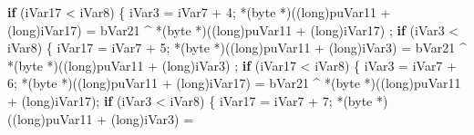 \documentclass[
]{article}
\newenvironment{Shaded}{}{}
\newcommand{\ControlFlowTok}[1]{\textcolor[rgb]{0.00,0.44,0.13}{\textbf{#1}}}
\newcommand{\DataTypeTok}[1]{\textcolor[rgb]{0.56,0.13,0.00}{#1}}
\newcommand{\DecValTok}[1]{\textcolor[rgb]{0.25,0.63,0.44}{#1}}
\newcommand{\NormalTok}[1]{#1}
\newcommand{\OperatorTok}[1]{\textcolor[rgb]{0.40,0.40,0.40}{#1}}
\begin{document}
\begin{Shaded}
\begin{Highlighting}[]
        \ControlFlowTok{if} \OperatorTok{(}\NormalTok{iVar17 }\OperatorTok{\textless{}}\NormalTok{ iVar8}\OperatorTok{)} \OperatorTok{\{}
\NormalTok{          iVar3 }\OperatorTok{=}\NormalTok{ iVar7 }\OperatorTok{+} \DecValTok{4}\OperatorTok{;}
          \OperatorTok{*(}\NormalTok{byte }\OperatorTok{*)((}\DataTypeTok{long}\OperatorTok{)}\NormalTok{puVar11 }\OperatorTok{+} \OperatorTok{(}\DataTypeTok{long}\OperatorTok{)}\NormalTok{iVar17}\OperatorTok{)} \OperatorTok{=}\NormalTok{ bVar21 }\OperatorTok{\^{}} \OperatorTok{*(}\NormalTok{byte }\OperatorTok{*)((}\DataTypeTok{long}\OperatorTok{)}\NormalTok{puVar11 }\OperatorTok{+} \OperatorTok{(}\DataTypeTok{long}\OperatorTok{)}\NormalTok{iVar17}\OperatorTok{)}
          \OperatorTok{;}
          \ControlFlowTok{if} \OperatorTok{(}\NormalTok{iVar3 }\OperatorTok{\textless{}}\NormalTok{ iVar8}\OperatorTok{)} \OperatorTok{\{}
\NormalTok{            iVar17 }\OperatorTok{=}\NormalTok{ iVar7 }\OperatorTok{+} \DecValTok{5}\OperatorTok{;}
            \OperatorTok{*(}\NormalTok{byte }\OperatorTok{*)((}\DataTypeTok{long}\OperatorTok{)}\NormalTok{puVar11 }\OperatorTok{+} \OperatorTok{(}\DataTypeTok{long}\OperatorTok{)}\NormalTok{iVar3}\OperatorTok{)} \OperatorTok{=}\NormalTok{ bVar21 }\OperatorTok{\^{}} \OperatorTok{*(}\NormalTok{byte }\OperatorTok{*)((}\DataTypeTok{long}\OperatorTok{)}\NormalTok{puVar11 }\OperatorTok{+} \OperatorTok{(}\DataTypeTok{long}\OperatorTok{)}\NormalTok{iVar3}\OperatorTok{)}
            \OperatorTok{;}
            \ControlFlowTok{if} \OperatorTok{(}\NormalTok{iVar17 }\OperatorTok{\textless{}}\NormalTok{ iVar8}\OperatorTok{)} \OperatorTok{\{}
\NormalTok{              iVar3 }\OperatorTok{=}\NormalTok{ iVar7 }\OperatorTok{+} \DecValTok{6}\OperatorTok{;}
              \OperatorTok{*(}\NormalTok{byte }\OperatorTok{*)((}\DataTypeTok{long}\OperatorTok{)}\NormalTok{puVar11 }\OperatorTok{+} \OperatorTok{(}\DataTypeTok{long}\OperatorTok{)}\NormalTok{iVar17}\OperatorTok{)} \OperatorTok{=}
\NormalTok{                   bVar21 }\OperatorTok{\^{}} \OperatorTok{*(}\NormalTok{byte }\OperatorTok{*)((}\DataTypeTok{long}\OperatorTok{)}\NormalTok{puVar11 }\OperatorTok{+} \OperatorTok{(}\DataTypeTok{long}\OperatorTok{)}\NormalTok{iVar17}\OperatorTok{);}
              \ControlFlowTok{if} \OperatorTok{(}\NormalTok{iVar3 }\OperatorTok{\textless{}}\NormalTok{ iVar8}\OperatorTok{)} \OperatorTok{\{}
\NormalTok{                iVar17 }\OperatorTok{=}\NormalTok{ iVar7 }\OperatorTok{+} \DecValTok{7}\OperatorTok{;}
                \OperatorTok{*(}\NormalTok{byte }\OperatorTok{*)((}\DataTypeTok{long}\OperatorTok{)}\NormalTok{puVar11 }\OperatorTok{+} \OperatorTok{(}\DataTypeTok{long}\OperatorTok{)}\NormalTok{iVar3}\OperatorTok{)} \OperatorTok{=}

\end{Highlighting}
\end{Shaded}
\end{document}
